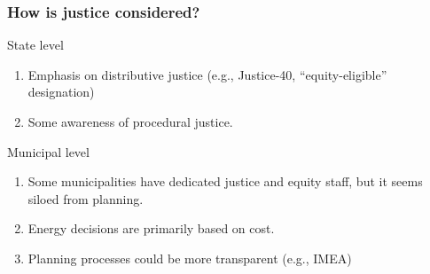 \begin{frame}
    \frametitle{How is justice considered?}
    \begin{block}{State level}
        \begin{enumerate}
            \item Emphasis on distributive justice (e.g., Justice-40, ``equity-eligible'' designation)
            \item Some awareness of procedural justice.
        \end{enumerate}
        
    \end{block}
    \pause
    \begin{block}{Municipal level}
        \begin{enumerate}
            \item Some municipalities have dedicated justice and equity staff, but it seems siloed from planning.
            \item Energy decisions are primarily based on cost.
            \item Planning processes could be more transparent (e.g., IMEA)
        \end{enumerate}
    \end{block}
\end{frame}


